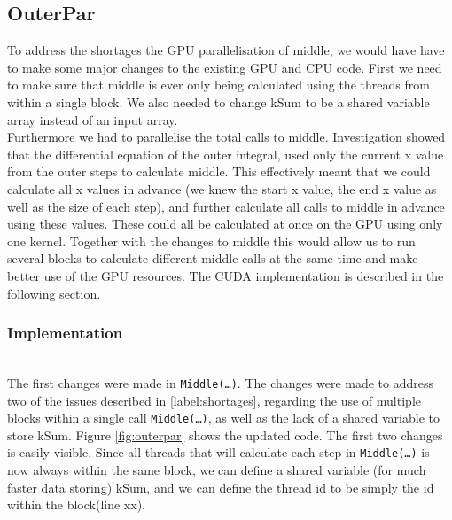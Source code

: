 \subsection{OuterPar}
To address the shortages the GPU parallelisation of middle, we would have have to make some major changes to the existing GPU and CPU code. First we need to make sure that middle is ever only being calculated using the threads from within a single block. We also needed to change kSum to be a shared variable array instead of an input array. \\

Furthermore we had to parallelise the total calls to middle. Investigation showed that the differential equation of the outer integral, used only the current x value from the outer steps to calculate middle. This effectively meant that we could calculate all x values in advance (we knew the start x value, the end x value as well as the size of each step), and further calculate all calls to middle in advance using these values. These could all be calculated at once on the GPU using only one kernel. Together with the changes to middle this would allow us to run several blocks to calculate different middle calls at the same time and make better use of the GPU resources. The CUDA implementation is described in the following section.

\subsubsection{Implementation} \hfill \\
The first changes were made in \texttt{Middle(…)}. The changes were made to address two of the issues described in \ref{label:shortages}, regarding the use of multiple blocks within a single call \texttt{Middle(…)}, as well as the lack of a shared variable to store kSum. Figure \ref{fig:outerpar} shows the updated code. The first two changes is easily  visible. Since all threads that will calculate each step in \texttt{Middle(…)} is now always within the same block, we can define a shared variable (for much faster data storing) kSum, and we can define the thread id to be simply the id within the block(line xx).\\

